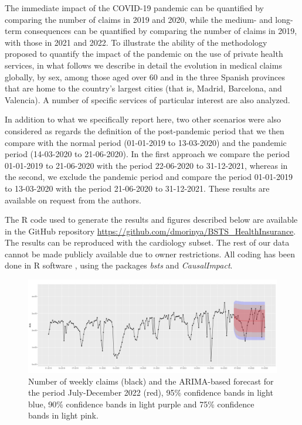 \documentclass[]{risa}
\begin{document}
The immediate impact of the COVID-19 pandemic can be quantified by comparing the number of claims in 2019 and 2020, while the medium- and long-term consequences can be quantified by comparing the number of claims in 2019, with those in 2021 and 2022. To illustrate the ability of the methodology proposed to quantify the impact of the pandemic on the use of  private health services, in what follows we describe in detail the evolution in medical claims globally, by sex, among those aged over 60 and in the three Spanish provinces that are home to the country’s largest cities (that is, Madrid, Barcelona, and Valencia). A number of specific services of particular interest are also analyzed.

In addition to what we specifically report here, two other scenarios were also considered as regards the definition of the post-pandemic period that we then compare with the normal period (01-01-2019 to 13-03-2020) and the pandemic period (14-03-2020 to 21-06-2020). In the first approach we compare the period 01-01-2019 to 21-06-2020 with the period 22-06-2020 to 31-12-2021, whereas in the second, we exclude the pandemic period and compare the period 01-01-2019 to 13-03-2020 with the period 21-06-2020 to 31-12-2021. These results are available on request from the authors.

The R code used to generate the results and figures described below are available in the GitHub repository \url{https://github.com/dmorinya/BSTS_HealthInsurance}. The results can be reproduced with the cardiology subset. The rest of our data cannot be made publicly available due to owner restrictions. All coding has been done in R software \cite{r_core_team_r_2019}, using the packages \textit{bsts} \cite{scott_predicting_nodate} and \textit{CausalImpact}\cite{brodersen_inferring_2015}. 
	
\begin{center}
  \begin{figure}[h]
	\begin{minipage}{160mm}
    \includegraphics[width=16cm]{arima_global_prediction.png}\caption{Number of weekly claims (black) and the ARIMA-based forecast for the period July-December 2022 (red), 95\% confidence bands in light blue, 90\% confidence bands in light purple and 75\% confidence bands in light pink.}\label{fig2}
	 \end{minipage}
  \end{figure}
	\end{center}
\end{document}
